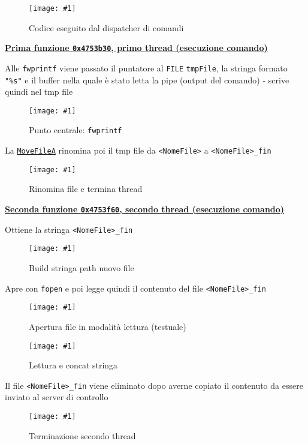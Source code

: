 \documentclass[
    a4paper, %
    11pt %
]{article}
\newcommand{\pic}[4]{\begin{figure}[H]
            \centering
            \texttt{[image: \#1]}
            \caption{#2}
            \label{fig:#1}
            \end{figure}}
\begin{document}
            \pic{adv_known_3}{Codice eseguito dal dispatcher di comandi}{15cm}{8cm}

            \underline{\textbf{Prima funzione \texttt{0x4753b30}, primo thread (esecuzione comando)}}

            Alle \texttt{fwprintf} viene passato il puntatore al \texttt{FILE} \texttt{tmpFile}, la
            stringa formato \texttt{"\%s"} e il buffer nella quale è stato letta la pipe (output del comando)
             - scrive quindi nel tmp file

            \pic{adv_known_3_fn1_writetmp}{Punto centrale: \texttt{fwprintf}}{16cm}{9cm}

            La \href{https://learn.microsoft.com/en-us/windows/win32/api/winbase/nf-winbase-movefilea}{\texttt{MoveFileA}} rinomina poi il tmp file da \texttt{<NomeFile>} a \texttt{<NomeFile>\_fin}
            
            \pic{adv_known_3_fn1_movetmp}{Rinomina file e termina thread}{17cm}{4cm}

            \underline{\textbf{Seconda funzione \texttt{0x4753f60}, secondo thread (esecuzione comando)}}

            Ottiene la stringa \texttt{<NomeFile>\_fin}

            \pic{adv_known_3_fn2_fmtnewtmp}{Build stringa path nuovo file}{19cm}{1.5cm}

            Apre con \texttt{fopen} e poi legge quindi il contenuto del file \texttt{<NomeFile>\_fin}

            \pic{adv_known_3_fn2_opennewtmp}{Apertura file in modalità lettura (testuale)}{14cm}{3cm}

            \pic{adv_known_3_fn2_readnewtmp}{Lettura e concat stringa}{14cm}{7cm}

            Il file \texttt{<NomeFile>\_fin} viene eliminato dopo averne copiato il contenuto da essere inviato
            al server di controllo
            
            \pic{adv_known_3_fn2_end}{Terminazione secondo thread}{13cm}{5cm}
\end{document}
